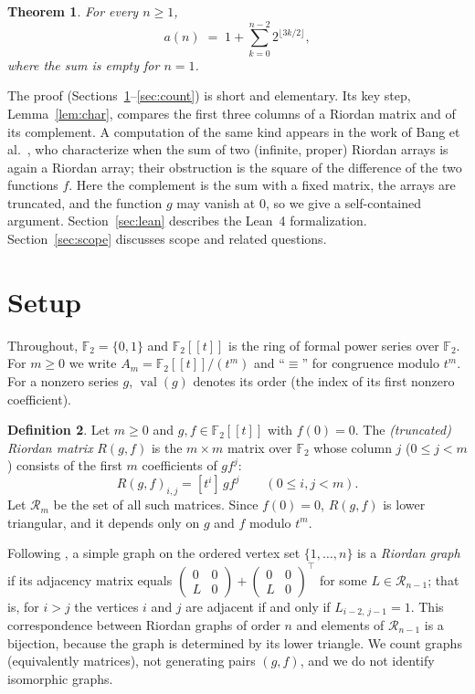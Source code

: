 \documentclass[11pt,a4paper]{amsart}
\newtheorem{theorem}{Theorem}[section]
\theoremstyle{definition}
\newtheorem{definition}[theorem]{Definition}
\theoremstyle{remark}
\newcommand{\F}{\mathbb{F}_2}
\newcommand{\Rm}{\mathcal{R}_m}
\newcommand{\val}{\operatorname{val}}
\begin{document}
\begin{theorem}\label{thm:main}
For every $n\ge 1$,
\[
  a(n) \;=\; 1+\sum_{k=0}^{n-2} 2^{\lfloor 3k/2\rfloor},
\]
where the sum is empty for $n=1$.
\end{theorem}

The proof (Sections~\ref{sec:setup}--\ref{sec:count}) is short and elementary. Its key step, Lemma~\ref{lem:char}, compares the first three columns of a Riordan matrix and of its complement. A computation of the same kind appears in the work of Bang et al.~\cite{BvBCDDPS}, who characterize when the sum of two (infinite, proper) Riordan arrays is again a Riordan array; their obstruction is the square of the difference of the two functions $f$. Here the complement is the sum with a fixed matrix, the arrays are truncated, and the function $g$ may vanish at $0$, so we give a self-contained argument. Section~\ref{sec:lean} describes the Lean~4 formalization. Section~\ref{sec:scope} discusses scope and related questions.

\section{Setup}\label{sec:setup}

Throughout, $\F=\{0,1\}$ and $\F[[t]]$ is the ring of formal power series over $\F$. For $m\ge 0$ we write $A_m=\F[[t]]/(t^m)$ and ``$\equiv$'' for congruence modulo $t^m$. For a nonzero series $g$, $\val(g)$ denotes its order (the index of its first nonzero coefficient).

\begin{definition}
Let $m\ge 0$ and $g,f\in\F[[t]]$ with $f(0)=0$. The \emph{(truncated) Riordan matrix} $R(g,f)$ is the $m\times m$ matrix over $\F$ whose column $j$ ($0\le j<m$) consists of the first $m$ coefficients of $g f^{j}$:
\[
  R(g,f)_{i,j} = [t^i]\, g f^{j}\qquad (0\le i,j<m).
\]
Let $\Rm$ be the set of all such matrices. Since $f(0)=0$, $R(g,f)$ is lower triangular, and it depends only on $g$ and $f$ modulo $t^m$.
\end{definition}

Following \cite{CJKM}, a simple graph on the ordered vertex set $\{1,\dots,n\}$ is a \emph{Riordan graph} if its adjacency matrix equals $\left(\begin{smallmatrix}0&0\\ L&0\end{smallmatrix}\right)+\left(\begin{smallmatrix}0&0\\ L&0\end{smallmatrix}\right)^{\!\top}$ for some $L\in\mathcal{R}_{n-1}$; that is, for $i>j$ the vertices $i$ and $j$ are adjacent if and only if $L_{i-2,\,j-1}=1$. This correspondence between Riordan graphs of order $n$ and elements of $\mathcal{R}_{n-1}$ is a bijection, because the graph is determined by its lower triangle. We count graphs (equivalently matrices), not generating pairs $(g,f)$, and we do not identify isomorphic graphs.
\end{document}
